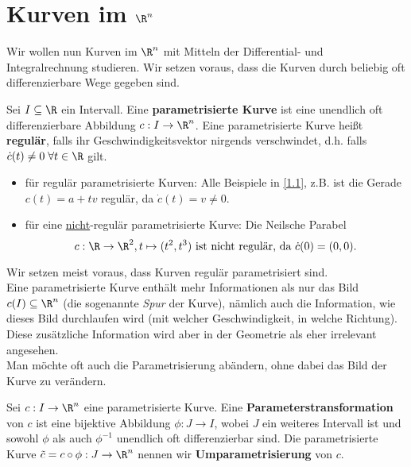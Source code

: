 \documentclass{mycourse}
\begin{document}
\section{Kurven im $\R^n$}
Wir wollen nun Kurven im $\R^n$ mit Mitteln der Differential- und Integralrechnung studieren. Wir setzen voraus, dass die Kurven durch beliebig oft differenzierbare Wege gegeben sind.

\begin{df}
Sei $I \subseteq \R$ ein Intervall. Eine \textbf{parametrisierte Kurve} ist eine unendlich oft differenzierbare Abbildung $c: I \to \R^n$. Eine parametrisierte Kurve heißt \textbf{regulär}, falls ihr Geschwindigkeitsvektor nirgends verschwindet, d.h. falls $\dot c (t) \neq 0 \; \forall t \in \R$ gilt.
\end{df}

\begin{ex*}
\begin{itemize}
	\item für regulär parametrisierte Kurven: Alle Beispiele in \ref{1.1}, z.B. ist die Gerade $c(t) = a+tv$ regulär, da $\dot c(t) = v \neq 0$.
	\item  für eine \underline{nicht}-regulär parametrisierte Kurve: Die Neilsche Parabel \[ c:\R \to \R^2, t \mapsto (t^2, t^3) \text{ ist nicht regulär, da } \dot c(0) = (0,0). \]
\end{itemize}
\end{ex*}

\begin{note}
Wir setzen meist voraus, dass Kurven regulär parametrisiert sind. \\
Eine parametrisierte Kurve enthält mehr Informationen als nur das Bild $c(I) \subseteq \R^n$ (die sogenannte \emph{Spur} der Kurve), nämlich auch die Information, wie dieses Bild durchlaufen wird (mit welcher Geschwindigkeit, in welche Richtung). Diese zusätzliche Information wird aber in der Geometrie als eher irrelevant angesehen. \\
Man möchte oft auch die Parametrisierung abändern, ohne dabei das Bild der Kurve zu verändern.
\end{note}

\begin{df}
Sei $c: I \to \R^n$ eine parametrisierte Kurve. Eine \textbf{Parameterstransformation} von $c$ ist eine bijektive Abbildung $\phi: J \to I$, wobei $J$ ein weiteres Intervall ist und sowohl $\phi$ als auch $\phi^{-1}$ unendlich oft differenzierbar sind. Die parametrisierte Kurve $\tilde c = c \circ \phi : J \to \R^n$ nennen wir \textbf{Umparametrisierung} von $c$. 
\end{df}
\end{document}

